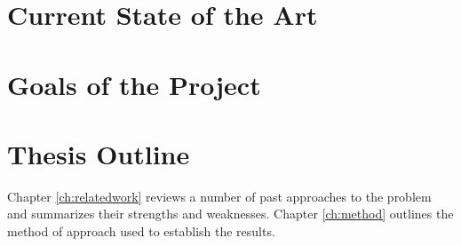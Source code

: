 \section{Current State of the Art}\label{ch:intro:stateofart}

\section{Goals of the Project}\label{ch:intro:goals}


\section{Thesis Outline}\label{ch:intro:outline}
Chapter \ref{ch:relatedwork} reviews a number of past approaches
to the problem and summarizes their strengths and weaknesses. Chapter
\ref{ch:method} outlines the method of approach used to establish the
results.
